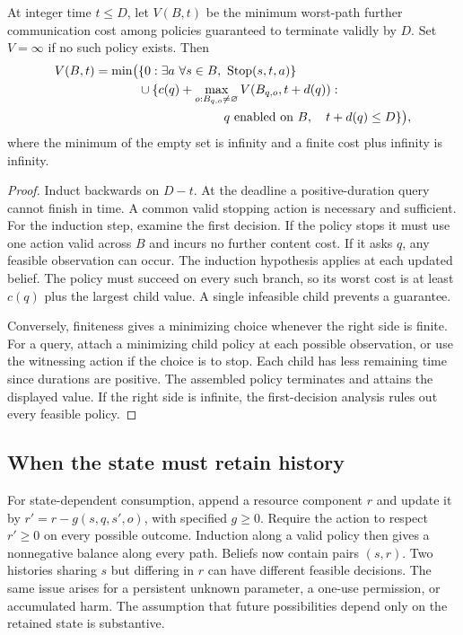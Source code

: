 \begin{theorem}\label{thm:bellman}
At integer time $t\le D$, let $V(B,t)$ be the minimum worst-path further communication cost among policies guaranteed to terminate validly by $D$. Set $V=\infty$ if no such policy exists. Then
\begin{align}\label{eq:bellman}
V(B,t)=\min\bigl(&\{0:\exists a\ \forall s\in B,\ \mathrm{Stop}(s,t,a)\}\notag\\
 &{}\cup\{c(q)+\max_{o:B_{q,o}\ne\varnothing}V(B_{q,o},t+d(q)):\notag\\
 &\hspace{24mm}q\text{ enabled on } B,\quad t+d(q)\le D\}\bigr),
\end{align}
where the minimum of the empty set is infinity and a finite cost plus infinity is infinity.
\end{theorem}
\begin{proof}
Induct backwards on $D-t$. At the deadline a positive-duration query cannot finish in time. A common valid stopping action is necessary and sufficient. For the induction step, examine the first decision. If the policy stops it must use one action valid across $B$ and incurs no further content cost. If it asks $q$, any feasible observation can occur. The induction hypothesis applies at each updated belief. The policy must succeed on every such branch, so its worst cost is at least $c(q)$ plus the largest child value. A single infeasible child prevents a guarantee.

Conversely, finiteness gives a minimizing choice whenever the right side is finite. For a query, attach a minimizing child policy at each possible observation, or use the witnessing action if the choice is to stop. Each child has less remaining time since durations are positive. The assembled policy terminates and attains the displayed value. If the right side is infinite, the first-decision analysis rules out every feasible policy.
\end{proof}

\subsection{When the state must retain history}
For state-dependent consumption, append a resource component $r$ and update it by $r'=r-g(s,q,s',o)$, with specified $g\ge0$. Require the action to respect $r'\ge0$ on every possible outcome. Induction along a valid policy then gives a nonnegative balance along every path. Beliefs now contain pairs $(s,r)$. Two histories sharing $s$ but differing in $r$ can have different feasible decisions. The same issue arises for a persistent unknown parameter, a one-use permission, or accumulated harm. The assumption that future possibilities depend only on the retained state is substantive.

